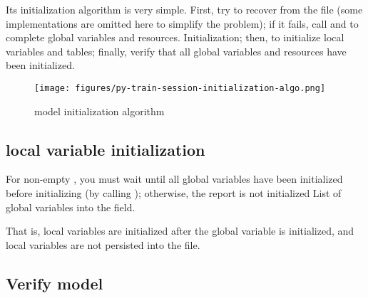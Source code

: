 \begin{content}
Its initialization algorithm is very simple. First, try to recover from the  file (some implementations are omitted here to simplify the problem); if it fails, call  and  to complete global variables and resources. Initialization; then, to initialize local variables and tables; finally, verify that all global variables and resources have been initialized.

\begin{figure}[!htbp]
\centering
\texttt{[image: figures/py-train-session-initialization-algo.png]}
\caption{model initialization algorithm}
 \label{fig:py-train-session-initialization-algo}
\end{figure}

\subsection{local variable initialization}

For non-empty , you must wait until all global variables have been initialized before initializing (by calling ); otherwise, the report is not initialized List of global variables into the  field.

That is, local variables are initialized after the global variable is initialized, and local variables are not persisted into the  file.


\subsection{Verify model}


\end{content}

